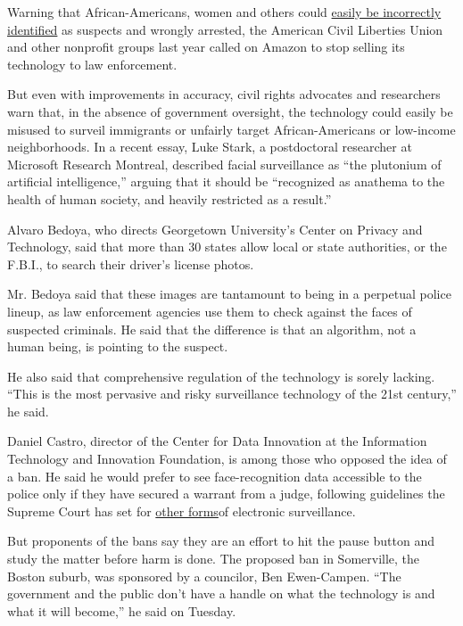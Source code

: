 Warning that African-Americans, women and others could
\href{https://www.nytimes3xbfgragh.onion/2018/07/26/technology/amazon-aclu-facial-recognition-congress.html}{easily
be incorrectly identified} as suspects and wrongly arrested, the
American Civil Liberties Union and other nonprofit groups last year
called on Amazon to stop selling its technology to law enforcement.

But even with improvements in accuracy, civil rights advocates and
researchers warn that, in the absence of government oversight, the
technology could easily be misused to surveil immigrants or unfairly
target African-Americans or low-income neighborhoods. In a recent essay,
Luke Stark, a postdoctoral researcher at Microsoft Research Montreal,
described facial surveillance as ``the plutonium of artificial
intelligence,'' arguing that it should be ``recognized as anathema to
the health of human society, and heavily restricted as a result.''

Alvaro Bedoya, who directs Georgetown University's Center on Privacy and
Technology, said that more than 30 states allow local or state
authorities, or the F.B.I., to search their driver's license photos.

Mr. Bedoya said that these images are tantamount to being in a perpetual
police lineup, as law enforcement agencies use them to check against the
faces of suspected criminals. He said that the difference is that an
algorithm, not a human being, is pointing to the suspect.

He also said that comprehensive regulation of the technology is sorely
lacking. ``This is the most pervasive and risky surveillance technology
of the 21st century,'' he said.

Daniel Castro, director of the Center for Data Innovation at the
Information Technology and Innovation Foundation, is among those who
opposed the idea of a ban. He said he would prefer to see
face-recognition data accessible to the police only if they have secured
a warrant from a judge, following guidelines the Supreme Court has set
for
\href{https://www.nytimes3xbfgragh.onion/2012/01/24/us/police-use-of-gps-is-ruled-unconstitutional.html}{other
forms}of electronic surveillance.

But proponents of the bans say they are an effort to hit the pause
button and study the matter before harm is done. The proposed ban in
Somerville, the Boston suburb, was sponsored by a councilor, Ben
Ewen-Campen. ``The government and the public don't have a handle on what
the technology is and what it will become,'' he said on Tuesday.

